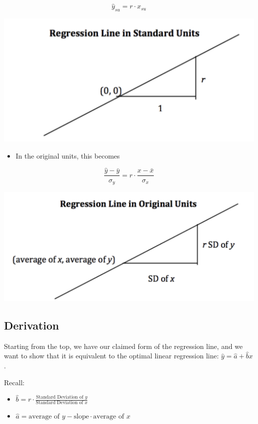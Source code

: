 \documentclass[
  letterpaper,
  DIV=11,
  numbers=noendperiod]{scrreprt}
\providecommand{\tightlist}{%
  \setlength{\itemsep}{0pt}\setlength{\parskip}{0pt}}\usepackage{longtable,booktabs,array}
\begin{document}
\[\hat{y}_{su} = r \cdot x_{su}\]

\includegraphics{intro_to_modeling/images/reg_line_1.png}

\begin{itemize}
\tightlist
\item
  In the original units, this becomes
\end{itemize}

\[\frac{\hat{y} - \bar{y}}{\sigma_y} = r \cdot \frac{x - \bar{x}}{\sigma_x}\]

\includegraphics{intro_to_modeling/images/reg_line_2.png}

\subsection{Derivation}\label{derivation}

Starting from the top, we have our claimed form of the regression line,
and we want to show that it is equivalent to the optimal linear
regression line: \(\hat{y} = \hat{a} + \hat{b}x\).

Recall:

\begin{itemize}
\tightlist
\item
  \(\hat{b} = r \cdot \frac{\text{Standard Deviation of }y}{\text{Standard Deviation of }x}\)
\item
  \(\hat{a} = \text{average of }y - \text{slope}\cdot\text{average of }x\)
\end{itemize}
\end{document}
